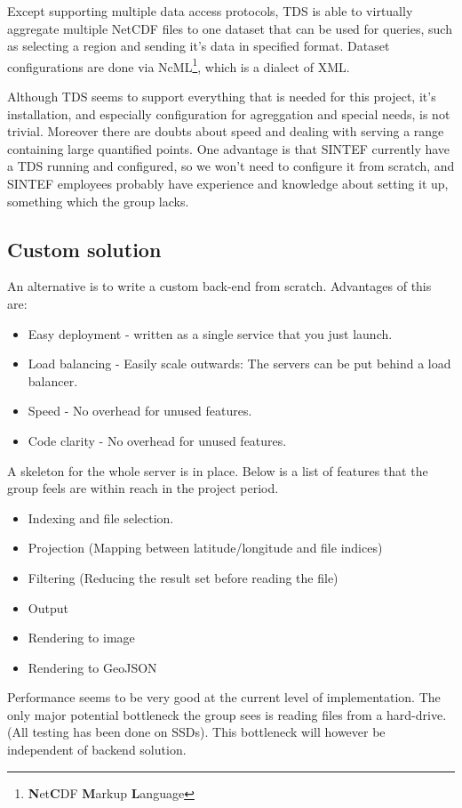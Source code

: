 \documentclass[11pt,a4paper,titlepage,oneside]{report}
\begin{document}
  Except supporting multiple data access protocols, TDS is able to virtually aggregate multiple NetCDF files to one dataset that can be used for queries, such as selecting a region and sending it's data in specified format. Dataset configurations are done via NcML\footnote{\textbf{N}et\textbf{C}DF \textbf{M}arkup \textbf{L}anguage}, which is a dialect of XML.

  Although TDS seems to support everything that is needed for this project, it's installation, and especially configuration for agreggation and special needs, is not trivial. Moreover there are doubts about speed and dealing with serving a range containing large quantified points. One advantage is that SINTEF currently have a TDS running and configured, so we won't need to configure it from scratch, and SINTEF employees probably have experience and knowledge about setting it up, something which the group lacks.

  \subsection{Custom solution}
  An alternative is to write a custom back-end from scratch.
  Advantages of this are:
  \begin{itemize}
  \item Easy deployment - written as a single service that you just launch.
  \item Load balancing - Easily scale outwards: The servers can be put behind a load balancer. 
  \item Speed - No overhead for unused features.
  \item Code clarity - No overhead for unused features.
  \end{itemize}
  A skeleton for the whole server is in place. Below is a list of features that the group feels are within reach in the project period. 
  \begin{itemize}
  \item Indexing and file selection.
  \item Projection (Mapping between latitude/longitude and file indices)
  \item Filtering (Reducing the result set before reading the file)
  \item Output
  \item Rendering to image
  \item Rendering to GeoJSON
  \end{itemize}

  Performance seems to be very good at the current level of implementation. The only major potential bottleneck the group sees is reading files from a hard-drive. (All testing has been done on SSDs). This bottleneck will however be independent of backend solution.
  
\end{document}
